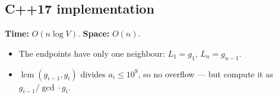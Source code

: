 \subsection*{C++17 implementation}

\begin{complexitybox}
\textbf{Time:} $O(n\log V)$. \textbf{Space:} $O(n)$.
\end{complexitybox}

\begin{pitfallbox}
\begin{itemize}
  \item The endpoints have only one neighbour: $L_1=g_1$, $L_n=g_{n-1}$.
  \item $\operatorname{lcm}(g_{i-1},g_i)$ divides $a_i\le10^9$, so no
        overflow --- but compute it as $g_{i-1}/\gcd\cdot g_i$.
\end{itemize}
\end{pitfallbox}
